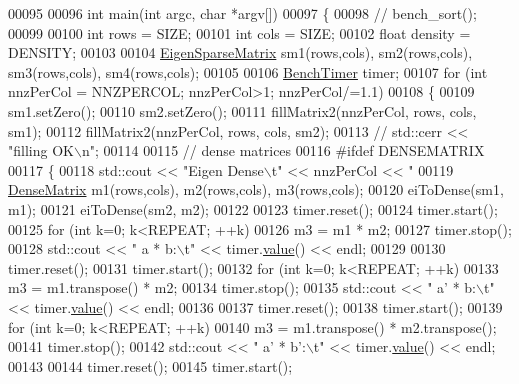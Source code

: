 \begin{DoxyCode}
00095 
00096 \textcolor{keywordtype}{int} main(\textcolor{keywordtype}{int} argc, \textcolor{keywordtype}{char} *argv[])
00097 \{
00098 \textcolor{comment}{//   bench\_sort();}
00099 
00100   \textcolor{keywordtype}{int} rows = SIZE;
00101   \textcolor{keywordtype}{int} cols = SIZE;
00102   \textcolor{keywordtype}{float} density = DENSITY;
00103 
00104   \hyperlink{group___sparse_core___module}{EigenSparseMatrix} sm1(rows,cols), sm2(rows,cols), sm3(rows,cols), sm4(rows,cols);
00105 
00106   \hyperlink{class_eigen_1_1_bench_timer}{BenchTimer} timer;
00107   \textcolor{keywordflow}{for} (\textcolor{keywordtype}{int} nnzPerCol = NNZPERCOL; nnzPerCol>1; nnzPerCol/=1.1)
00108   \{
00109     sm1.setZero();
00110     sm2.setZero();
00111     fillMatrix2(nnzPerCol, rows, cols, sm1);
00112     fillMatrix2(nnzPerCol, rows, cols, sm2);
00113 \textcolor{comment}{//     std::cerr << "filling OK\(\backslash\)n";}
00114 
00115     \textcolor{comment}{// dense matrices}
00116 \textcolor{preprocessor}{    #ifdef DENSEMATRIX}
00117     \{
00118       std::cout << \textcolor{stringliteral}{"Eigen Dense\(\backslash\)t"} << nnzPerCol << \textcolor{stringliteral}{"%
00119       \hyperlink{group___core___module}{DenseMatrix} m1(rows,cols), m2(rows,cols), m3(rows,cols);
00120       eiToDense(sm1, m1);
00121       eiToDense(sm2, m2);
00122 
00123       timer.reset();
00124       timer.start();
00125       \textcolor{keywordflow}{for} (\textcolor{keywordtype}{int} k=0; k<REPEAT; ++k)
00126         m3 = m1 * m2;
00127       timer.stop();
00128       std::cout << \textcolor{stringliteral}{"   a * b:\(\backslash\)t"} << timer.\hyperlink{class_eigen_1_1_bench_timer_a26760f963ed8b64c126159bfea57735e}{value}() << endl;
00129 
00130       timer.reset();
00131       timer.start();
00132       \textcolor{keywordflow}{for} (\textcolor{keywordtype}{int} k=0; k<REPEAT; ++k)
00133         m3 = m1.transpose() * m2;
00134       timer.stop();
00135       std::cout << \textcolor{stringliteral}{"   a' * b:\(\backslash\)t"} << timer.\hyperlink{class_eigen_1_1_bench_timer_a26760f963ed8b64c126159bfea57735e}{value}() << endl;
00136 
00137       timer.reset();
00138       timer.start();
00139       \textcolor{keywordflow}{for} (\textcolor{keywordtype}{int} k=0; k<REPEAT; ++k)
00140         m3 = m1.transpose() * m2.transpose();
00141       timer.stop();
00142       std::cout << \textcolor{stringliteral}{"   a' * b':\(\backslash\)t"} << timer.\hyperlink{class_eigen_1_1_bench_timer_a26760f963ed8b64c126159bfea57735e}{value}() << endl;
00143 
00144       timer.reset();
00145       timer.start();
}
\end{DoxyCode}
